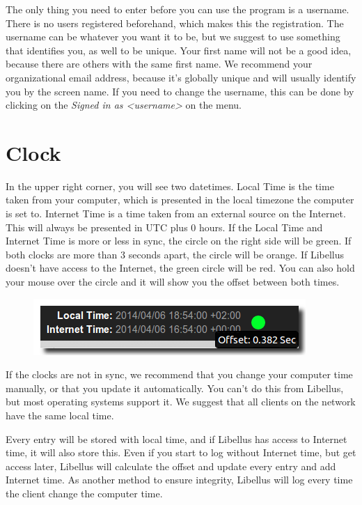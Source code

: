 \documentclass[letterpaper,10pt,english]{sphinxmanual}
\begin{document}
The only thing you need to enter before you can use the program is a username. There is no users registered beforehand, which makes this the registration. The username can be whatever you want it to be, but we suggest to use something that identifies you, as well to be unique. Your first name will not be a good idea, because there are others with the same first name. We recommend your organizational email address, because it’s globally unique and will usually identify you by the screen name. If you need to change the username, this can be done by clicking on the \emph{Signed in as \textless{}username\textgreater{}} on the menu.


\section{Clock}
\label{User manual:clock}
In the upper right corner, you will see two datetimes. Local Time is the time taken from your computer, which is presented in the local timezone the computer is set to. Internet Time is a time taken from an external source on the Internet. This will always be presented in UTC plus 0 hours. If the Local Time and Internet Time is more or less in sync, the circle on the right side will be green. If both clocks are more than 3 seconds apart, the circle will be orange. If Libellus doesn’t have access to the Internet, the green circle will be red. You can also hold your mouse over the circle and it will show you the offset between both times.
\begin{figure}[htbp]
\centering

\includegraphics{clock.png}
\end{figure}

If the clocks are not in sync, we recommend that you change your computer time manually, or that you update it automatically. You can’t do this from Libellus, but most operating systems support it. We suggest that all clients on the network have the same local time.

Every entry will be stored with local time, and if Libellus has access to Internet time, it will also store this. Even if you start to log without Internet time, but get access later, Libellus will calculate the offset and update every entry and add Internet time. As another method to ensure integrity, Libellus will log every time the client change the computer time.
\end{document}
